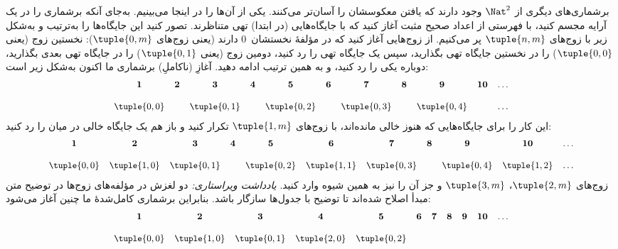 \documentclass[../../../include/open-logic-section]{subfiles}
\begin{document}


\begin{explain}
برشماری‌های دیگری از $\Nat^2$ وجود دارند که یافتن معکوسشان را آسان‌تر
می‌کنند. یکی از آن‌ها را در اینجا می‌بینیم. به‌جای آنکه برشماری را در
یک آرایه مجسم کنید، با فهرستی از اعداد صحیح مثبت آغاز کنید که با
جایگاه‌هایی (در ابتدا) تهی متناظرند. تصور کنید این جایگاه‌ها را به‌ترتیب
و به‌شکل زیر با زوج‌های $\tuple{n,m}$ پر می‌کنیم. از زوج‌هایی آغاز کنید
که در مؤلفهٔ نخستشان~$0$ دارند (یعنی زوج‌های $\tuple{0,m}$): نخستین زوج
(یعنی $\tuple{0,0}$) را در نخستین جایگاه تهی بگذارید، سپس یک جایگاه تهی
را رد کنید، دومین زوج (یعنی $\tuple{0,1}$) را در جایگاه تهی بعدی بگذارید،
دوباره یکی را رد کنید، و به همین ترتیب ادامه دهید. آغازِ (ناکاملِ)
برشماری ما اکنون به‌شکل زیر است:
\[\small
\begin{array}{@{}c c c c c c c c c c c@{}}
\mathbf 1 & \mathbf 2 & \mathbf 3 & \mathbf 4 & \mathbf 5 & \mathbf 6 & \mathbf 7 & \mathbf 8 & \mathbf 9 & \mathbf{10} & \dots \\ \\
\tuple{0,0} &  & \tuple{0,1} &  & \tuple{0,2} &  & \tuple{0,3} & & \tuple{0,4} &  & \dots \\
\end{array}
\]
این کار را برای جایگاه‌هایی که هنوز خالی مانده‌اند، با زوج‌های
$\tuple{1,m}$ تکرار کنید و باز هم یک جایگاه خالی در میان را رد کنید:
\[\small
\begin{array}{@{}c c c c c c c c c c c@{}}
\mathbf 1 & \mathbf 2 & \mathbf 3 & \mathbf 4 & \mathbf 5 & \mathbf 6 & \mathbf 7 & \mathbf 8 & \mathbf 9 & \mathbf{10} & \dots \\ \\
\tuple{0,0} & \tuple{1,0} & \tuple{0,1} &  & \tuple{0,2} & \tuple{1,1} &
\tuple{0,3} & & \tuple{0,4} &  \tuple{1,2} & \dots \\
\end{array}
\]
زوج‌های $\tuple{2,m}$، $\tuple{3,m}$ و جز آن را نیز به همین شیوه وارد
کنید. \emph{یادداشت ویراستاری:} دو لغزش در مؤلفه‌های زوج‌ها در توضیح متن مبدأ
اصلاح شده‌اند تا توضیح با جدول‌ها سازگار باشد.
بنابراین برشماری کامل‌شدهٔ ما چنین آغاز می‌شود:
\[\small
\begin{array}{@{}cc c c c c c c c c c@{}}
\mathbf 1 & \mathbf 2 & \mathbf 3 & \mathbf 4 & \mathbf 5 & \mathbf 6 & \mathbf 7 & \mathbf 8 & \mathbf 9 & \mathbf{10} & \dots \\ \\
\tuple{0,0} & \tuple{1,0} & \tuple{0,1} & \tuple{2,0}  & \tuple{0,2} &

\end{array}\]
\end{explain}
\end{document}
